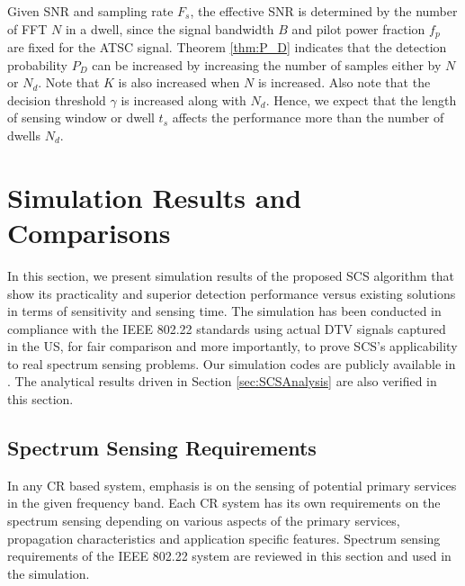\documentclass[draftclsnofoot,onecolumn,12pt]{IEEEtran}
\begin{document}
Given SNR and sampling rate $F_s$, the effective SNR is determined by the number of FFT $N$ in a dwell, since the signal bandwidth $B$ and pilot power fraction $f_p$ are fixed for the ATSC signal.
Theorem \ref{thm:P_D} indicates
that the detection probability $P_D$ can be increased by increasing the number of samples either by $N$ or $N_d$. Note that $K$ is also increased when $N$ is increased. Also note that the decision threshold $\gamma$ is increased along with $N_d$.
Hence, we expect that the length of sensing window or dwell $t_s$ affects the performance more than the number of dwells $N_d$.





\section{Simulation Results and Comparisons} \label{sec:SimResults}


In this section, we present simulation results of the proposed SCS algorithm that show its practicality and superior detection performance versus existing solutions in terms of sensitivity and sensing time. 
The simulation has been conducted in compliance with the IEEE 802.22 standards using actual DTV signals captured in the US, for fair comparison and more importantly, to prove SCS's applicability to real spectrum sensing problems.
Our simulation codes are publicly available in \cite{SCS-CODE-URL}.
The analytical results driven in Section \ref{sec:SCSAnalysis} are also verified in this section.
\subsection{Spectrum Sensing Requirements}
\label{subsec:requirements}


In any CR based system, emphasis is on the sensing of potential primary services in the given frequency band.
Each CR system has its own requirements on the spectrum sensing depending on various aspects of the primary services, propagation characteristics and
application specific features.
Spectrum sensing requirements of the IEEE 802.22 system are reviewed in this section and used in the simulation.
\end{document}
